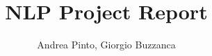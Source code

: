 \documentclass[12pt,a4paper,openany,oneside]{book}
\begin{document}



\title{NLP Project Report}
\author{Andrea Pinto, Giorgio Buzzanca}

%

\tableofcontents








\newpage
{}

\end{document}
